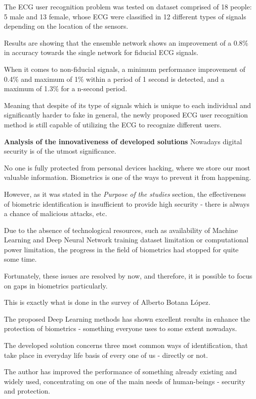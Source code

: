 \documentclass[a4paper, 12pt]{article}
\begin{document}
The ECG user recognition problem was tested on dataset comprised of 18 people: 5 male and 13 female, whose ECG were classified in
12 different types of signals depending on the location of the sensors. 

Results are showing that the ensemble network shows an improvement of a 0.8\% in accuracy towards the single
network for fiducial ECG signals.

When it comes to non-fiducial signals, a minimum performance
improvement of 0.4\% and maximum of 1\% within a period of 1 second is detected, and a maximum of 1.3\% for a n-second period.

Meaning that despite of its type of signals which is unique to each individual and significantly harder to fake in general, the newly proposed ECG user recognition method is still capable of utilizing the ECG to recognize different users.

\clearpage

\Large \textbf{Analysis of the innovativeness of
developed solutions}
\bigbreak
\large 
Nowadays digital security is of the utmost significance. 

No one is fully protected from personal devices hacking, where we
store our most valuable information. Biometrics is one of the ways to prevent it from happening. 

However, as it was stated in the \emph{Purpose of the studies} section, the effectiveness of biometric identification is insufficient to provide high security - there is always a chance of malicious attacks, etc.

Due to the absence of technological resources, such as availability of Machine Learning and Deep Neural Network training dataset limitation or computational power limitation, the progress in the field of biometrics had stopped for quite some time.

Fortunately, these issues are resolved by now, and therefore, it is possible to focus on gaps in biometrics particularly. 

This is exactly what is done in the survey of Alberto Botana López.

The proposed Deep Learning methods has shown excellent results in 
enhance the protection of biometrics - something everyone uses to some extent nowadays.

The developed solution concerns three most common ways of identification, that take place in everyday life basis of every one of us - directly or not.

The author has improved the performance of something already existing and widely used, concentrating on one of the main needs of human-beings - security and protection.
\end{document}
